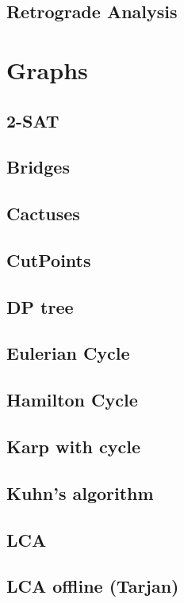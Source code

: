 \subsection{Retrograde Analysis}



\section{Graphs}

\subsection{2-SAT}

\subsection{Bridges}

\subsection{Cactuses}

\subsection{CutPoints}

\subsection{DP tree}

\subsection{Eulerian Cycle}

\subsection{Hamilton Cycle}

\subsection{Karp with cycle}

\subsection{Kuhn's algorithm}

\subsection{LCA}

\subsection{LCA offline (Tarjan)}



